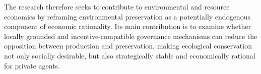 The research therefore seeks to contribute to environmental and resource economics by reframing environmental preservation as a potentially endogenous component of economic rationality. Its main contribution is to examine whether locally grounded and incentive-compatible governance mechanisms can reduce the opposition between production and preservation, making ecological conservation not only socially desirable, but also strategically stable and economically rational for private agents.

\newpage

